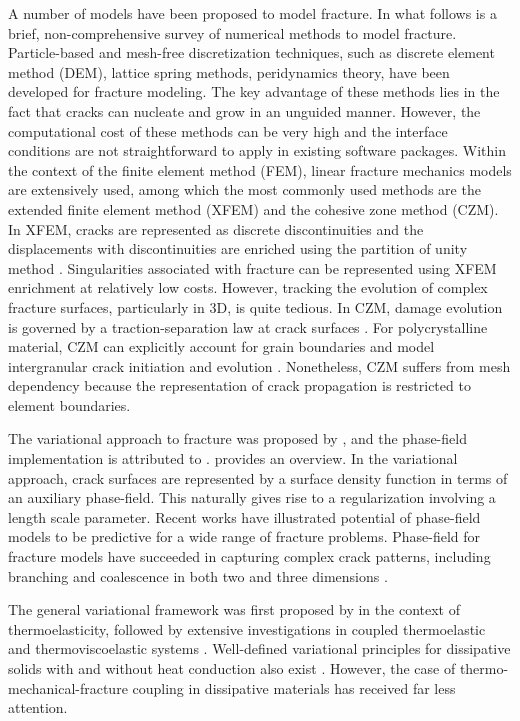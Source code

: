A number of models have been proposed to model fracture. In what follows is a brief, non-comprehensive survey of numerical methods to model fracture. Particle-based and mesh-free discretization techniques, such as discrete element method (DEM), lattice spring methods, peridynamics theory, have been developed for fracture modeling. The key advantage of these methods lies in the fact that cracks can nucleate and grow in an unguided manner. However, the computational cost of these methods can be very high and the interface conditions are not straightforward to apply in existing software packages. Within the context of the finite element method (FEM), linear fracture mechanics models are extensively used, among which the most commonly used methods are the extended finite element method (XFEM) and the cohesive zone method (CZM). In XFEM, cracks are represented as discrete discontinuities and the displacements with discontinuities are enriched using the partition of unity method \cite{babuaka1997, Dolbow99}. Singularities associated with fracture can be represented using XFEM enrichment at relatively low costs. However, tracking the evolution of complex fracture surfaces, particularly in 3D, is quite tedious. In CZM, damage evolution is governed by a traction-separation law at crack surfaces \cite{needleman_1992, ortiz_1999}. For polycrystalline material, CZM can explicitly account for grain boundaries and model intergranular crack initiation and evolution \cite{KAMAYA2007, KAMAYA2009}. Nonetheless, CZM suffers from mesh dependency because the representation of crack propagation is restricted to element boundaries.

The variational approach to fracture was proposed by \citet{Francfort98}, and the phase-field implementation is attributed to \citet{Bourdin2000}.
\citet{bourdin2008variational} provides an overview.  In the variational approach, crack surfaces are represented by a surface density function in terms of an auxiliary phase-field. This naturally gives rise to a regularization involving a length scale parameter. Recent works have illustrated potential of phase-field models to be predictive for a wide range of fracture problems. Phase-field for fracture models have succeeded in capturing complex crack patterns, including branching and coalescence in both two and three dimensions \cite{karma_2001, karma_2004, henry_2004, spatschek_2007, amor_2009}.

The general variational framework was first proposed by \citet{biot1956thermoelasticity} in the context of thermoelasticity, followed by extensive investigations in coupled thermoelastic and thermoviscoelastic systems \cite{herrmann1963variational,ben1965variational,oden2012variational,molinari1987global,batra1989principle,matsubara2021variationally}. Well-defined variational principles for dissipative solids with and without heat conduction also exist \cite{ortiz_1999,yang2006variational}. However, the case of thermo-mechanical-fracture coupling in dissipative materials has received far less attention.

